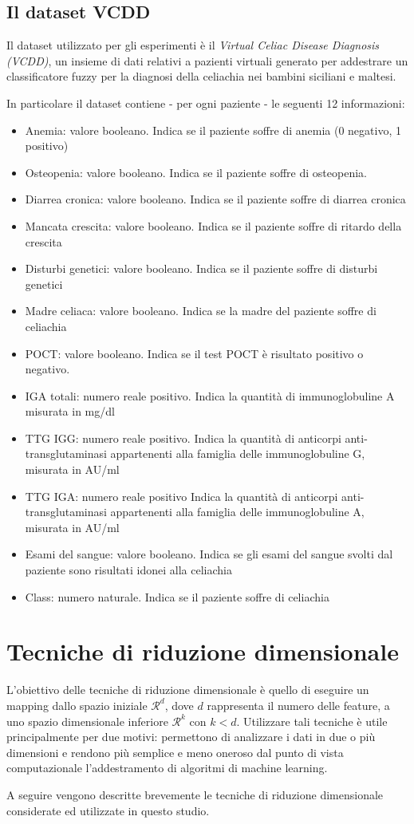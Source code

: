 \documentclass[11pt,a4paper,twocolumn]{article}
\begin{document}
\subsection{Il dataset VCDD}
Il dataset utilizzato per gli esperimenti è il \emph{Virtual Celiac Disease Diagnosis (VCDD)}, un insieme di dati relativi a pazienti virtuali generato per addestrare un classificatore fuzzy per la diagnosi della celiachia nei bambini siciliani e maltesi.\par
In particolare il dataset contiene - per ogni paziente - le seguenti 12 informazioni:
\begin{itemize}
	\item Anemia: valore booleano. Indica se il paziente soffre di anemia (0 negativo, 1 positivo)
	\item Osteopenia: valore booleano. Indica se il paziente soffre di osteopenia.
	\item Diarrea cronica: valore booleano. Indica se il paziente soffre di diarrea cronica
	\item Mancata crescita: valore booleano. Indica se il paziente soffre di ritardo della crescita
	\item Disturbi genetici: valore booleano. Indica se il paziente soffre di disturbi genetici
	\item Madre celiaca: valore booleano. Indica se la madre del paziente soffre di celiachia
	\item POCT: valore booleano. Indica se il test POCT è risultato positivo o negativo.
	\item IGA totali: numero reale positivo. Indica la quantità di immunoglobuline A misurata in mg/dl
	\item TTG IGG: numero reale positivo. Indica la quantità di anticorpi anti-transglutaminasi appartenenti alla famiglia delle immunoglobuline G, misurata in AU/ml
	\item TTG IGA: numero reale positivo Indica la quantità di anticorpi anti-transglutaminasi appartenenti alla famiglia delle immunoglobuline A, misurata in AU/ml
	\item Esami del sangue: valore booleano. Indica se gli esami del sangue svolti dal paziente sono risultati idonei alla celiachia
	\item Class: numero naturale. Indica se il paziente soffre di celiachia
\end{itemize}
\section{Tecniche di riduzione dimensionale}
L'obiettivo delle tecniche di riduzione dimensionale è quello di eseguire un mapping dallo spazio iniziale $ \mathcal{R}^d$, dove $ d $ rappresenta il numero delle feature, a uno spazio dimensionale inferiore  $ \mathcal{R}^k$ con $ k<d $. Utilizzare tali tecniche è utile principalmente per due motivi: permettono di analizzare i dati in due o più dimensioni e rendono più semplice e meno oneroso dal punto di vista computazionale l'addestramento di algoritmi di machine learning. \par
A seguire vengono descritte brevemente le tecniche di riduzione dimensionale considerate ed utilizzate in questo studio.
\end{document}
